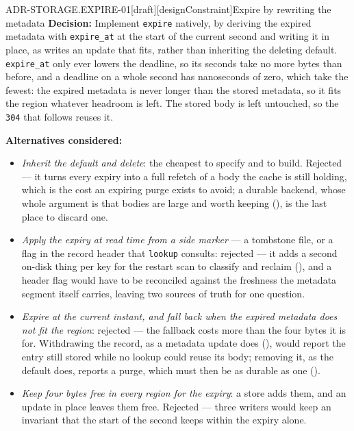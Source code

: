\begin{requirement}{ADR-STORAGE.EXPIRE-01}[draft][designConstraint]{Expire by rewriting the metadata}
  \textbf{Decision:} Implement \texttt{expire} natively, by deriving the
  expired metadata with \texttt{expire\_at} at the start of the current
  second and writing it in place, as 
  writes an update that fits, rather than inheriting the deleting default.
  \texttt{expire\_at} only ever lowers the deadline, so its seconds take no
  more bytes than before, and a deadline on a whole second has nanoseconds
  of zero, which take the fewest: the expired metadata is never longer than
  the stored metadata, so it fits the region whatever headroom is left. The
  stored body is left untouched, so the \texttt{304} that follows reuses it.

  \textbf{Alternatives considered:}
  \begin{itemize}
    \item \emph{Inherit the default and delete}: the cheapest to specify and to
      build. Rejected --- it turns every expiry into a full refetch of a body
      the cache is still holding, which is the cost an expiring purge exists to
      avoid; a durable backend, whose whole argument is that bodies are large
      and worth keeping (), is the last place
      to discard one.
    \item \emph{Apply the expiry at read time from a side marker} --- a
      tombstone file, or a flag in the record header that \texttt{lookup}
      consults: rejected --- it adds a second on-disk thing per key for the
      restart scan to classify and reclaim (),
      and a header flag would have to be reconciled against the freshness the
      metadata segment itself carries, leaving two sources of truth for one
      question.
    \item \emph{Expire at the current instant, and fall back when the expired
      metadata does not fit the region}: rejected --- the fallback costs more
      than the four bytes it is for. Withdrawing the record, as a metadata
      update does (), would report the
      entry still stored while no lookup could reuse its body; removing it,
      as the default does, reports a purge, which must then be as durable as
      one ().
    \item \emph{Keep four bytes free in every region for the expiry}: a store
      adds them, and an update in place leaves them free. Rejected --- three
      writers would keep an invariant that the start of the second keeps
      within the expiry alone.
  \end{itemize}


\end{requirement}
